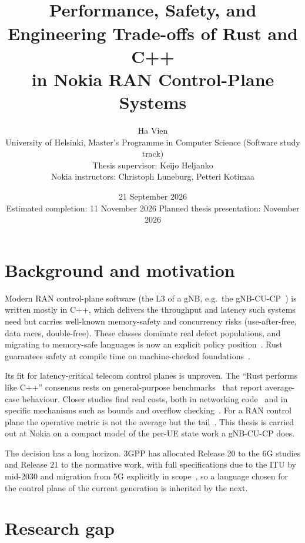 \documentclass[11pt,a4paper]{article}
\title{\vspace{-1.5cm}{\LARGE\bfseries Thesis Plan}\\[0.3em]
{\large\bfseries Performance, Safety, and Engineering Trade-offs of Rust and C++\\
in Nokia RAN Control-Plane Systems}}
\author{Ha Vien \\
\normalsize University of Helsinki, Master's Programme in Computer Science
(Software study track)\\
\normalsize Thesis supervisor: Keijo Heljanko\\
\normalsize Nokia instructors: Christoph Luneburg, Petteri Kotimaa}
\date{\normalsize 21 September 2026\\[0.5em]
\normalsize Estimated completion: 11 November 2026 \quad Planned thesis presentation: November 2026}
\begin{document}
\maketitle
\vspace{-0.9em}

\section{Background and motivation}

Modern RAN control-plane software (the L3 of a gNB, e.g.\ the
gNB-CU-CP~\cite{3gpp38401}) is written mostly in C++, which delivers the
throughput and latency such systems need but carries well-known memory-safety
and concurrency risks (use-after-free, data races, double-free). These classes
dominate real defect populations, and migrating to memory-safe languages is now
an explicit policy position~\cite{msrc2019memory,cisa2023memorysafe}. Rust
guarantees safety at compile time on machine-checked
foundations~\cite{jung2018rustbelt}.

Its fit for latency-critical telecom control planes is unproven. The ``Rust
performs like C++'' consensus rests on general-purpose
benchmarks~\cite{pereira2017energy} that report average-case behaviour. Closer
studies find real costs, both in networking code~\cite{emmerich2019drivers} and
in specific mechanisms such as bounds and overflow
checking~\cite{zhang2022runtime}. For a RAN control plane the operative metric
is not the average but the tail~\cite{dean2013tail}. This thesis is carried out
at Nokia on a compact model of the per-UE state work a gNB-CU-CP does.

The decision has a long horizon. 3GPP has allocated Release 20 to the 6G
studies and Release 21 to the normative work, with full specifications due to
the ITU by mid-2030 and migration from 5G explicitly in
scope~\cite{3gpp2024road6g,itu2023imt2030}, so a language chosen for the
control plane of the current generation is inherited by the next.

\section{Research gap}
\end{document}
